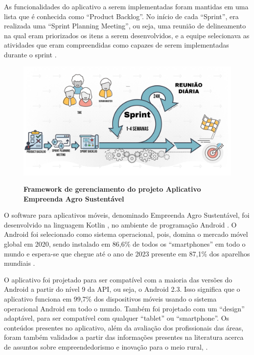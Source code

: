 As funcionalidades do aplicativo a serem implementadas foram mantidas em uma lista que é conhecida como “Product Backlog”. No início de cada “Sprint”, era realizada uma “Sprint Planning Meeting”, ou seja, uma reunião de delineamento na qual eram priorizados os itens a serem desenvolvidos, e a equipe selecionava as atividades que eram compreendidas como capazes de serem implementadas durante o sprint \cite{trainning_education_services_curso_2018}.

\begin{figure}[H]
\centering
\caption{\textbf{Framework de gerenciamento do projeto Aplicativo Empreenda Agro Sustentável }}
\includegraphics[scale=0.1]{Imagens/scrum.png}
\label{figura_47}
\end{figure}

O software para aplicativos móveis, denominado Empreenda Agro Sustentável, foi desenvolvido na linguagem Kotlin \cite{smyth_kotlinandroid_2017}, no ambiente de programação Android \cite{android_conheco_2019}. O Android foi selecionado como sistema operacional, pois, domina o mercado móvel global em 2020, sendo instalado em 86,6\% de todos os “smartphones” em todo o mundo e espera-se que chegue até o ano de 2023 presente em 87,1\% dos aparelhos mundiais \cite{idc_idc_2020}.

O aplicativo foi projetado para ser compatível com a maioria das versões do Android a partir do nível 9 da API, ou seja, o Android 2.3. Isso significa que o aplicativo funciona em 99,7\% dos dispositivos móveis usando o sistema operacional Android em todo o mundo. Também foi projetado com um “design” adaptável, para ser compatível com qualquer “tablet” ou “smartphone”. Os conteúdos presentes no aplicativo, além da avaliação dos profissionais das áreas, foram também validados a partir das informações presentes na literatura acerca de assuntos sobre empreendedorismo e inovação para o meio rural, \cite{melo_sebrae_2008,oliveira_perfil_2006}.


